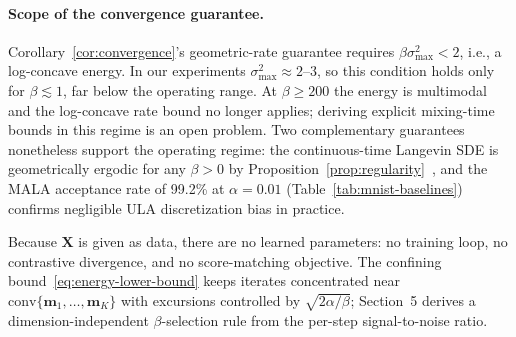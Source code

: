 \paragraph{Scope of the convergence guarantee.}
Corollary~\ref{cor:convergence}'s geometric-rate guarantee requires $\beta\sigma_{\max}^{2}<2$, i.e., a log-concave energy. In our experiments $\sigma_{\max}^{2}\approx 2$--$3$, so this condition holds only for $\beta\lesssim 1$, far below the operating range. At $\beta\ge 200$ the energy is multimodal and the log-concave rate bound no longer applies; deriving explicit mixing-time bounds in this regime is an open problem. Two complementary guarantees nonetheless support the operating regime: the continuous-time Langevin SDE is geometrically ergodic for any $\beta>0$ by Proposition~\ref{prop:regularity}~\cite{robertsTweedieExponentialConvergence1996}, and the MALA acceptance rate of 99.2\% at $\alpha{=}0.01$ (Table~\ref{tab:mnist-baselines}) confirms negligible ULA discretization bias in practice.

Because $\mathbf{X}$ is given as data, there are no learned parameters: no training loop, no contrastive divergence, and no score-matching objective. The confining bound~\eqref{eq:energy-lower-bound} keeps iterates concentrated near $\mathrm{conv}\{\mathbf{m}_1,\dots,\mathbf{m}_K\}$ with excursions controlled by $\sqrt{2\alpha/\beta}$; Section~5 derives a dimension-independent $\beta$-selection rule from the per-step signal-to-noise ratio.